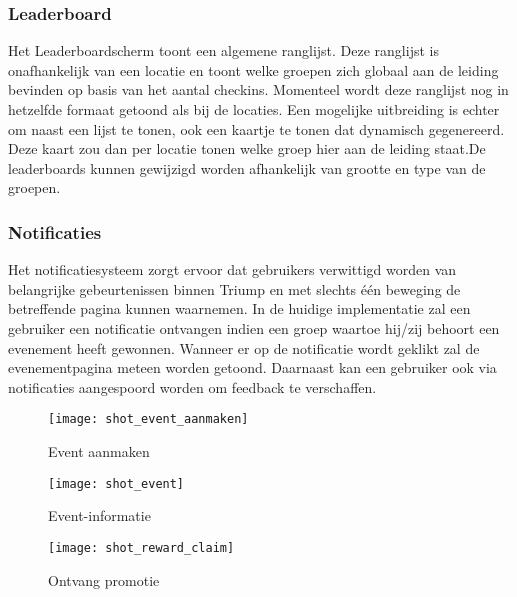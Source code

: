 \subsubsection{Leaderboard}%
Het Leaderboardscherm toont een algemene ranglijst. Deze ranglijst is onafhankelijk van een locatie en toont welke groepen zich globaal aan de leiding bevinden op basis van het aantal checkins. Momenteel wordt deze ranglijst nog in hetzelfde formaat getoond als bij de locaties. Een mogelijke uitbreiding is echter om naast een lijst te tonen, ook een kaartje te tonen dat dynamisch gegenereerd. Deze kaart zou dan per locatie tonen welke groep hier aan de leiding staat.De leaderboards kunnen gewijzigd worden afhankelijk van grootte en type van de groepen.



\subsubsection{Notificaties} %
Het notificatiesysteem zorgt ervoor dat gebruikers verwittigd worden van belangrijke gebeurtenissen binnen Triump en met slechts één beweging de betreffende pagina kunnen waarnemen. In de huidige implementatie zal een gebruiker een notificatie ontvangen indien een groep waartoe hij/zij behoort een evenement heeft gewonnen. Wanneer er op de notificatie wordt geklikt zal de evenementpagina meteen worden getoond. Daarnaast kan een gebruiker ook via notificaties aangespoord worden om feedback te verschaffen.   

\begin{figure}[ht]

\begin{minipage}[b]{0.25\linewidth}
\centering
\texttt{[image: shot\_event\_aanmaken]}
\caption{Event aanmaken}
\label{fig:shot_event_aanmaken}
\end{minipage}
\hspace{1.8cm}
\begin{minipage}[b]{0.25\linewidth}
\centering
\texttt{[image: shot\_event]}
\caption{Event-informatie}
\label{fig:shot_event}
\end{minipage}
\hspace{1.8cm}
\begin{minipage}[b]{0.25\linewidth}
\centering
\texttt{[image: shot\_reward\_claim]}
\caption{Ontvang promotie}
\label{fig:shot_reward_claim}
\end{minipage}
\end{figure}
\clearpage

